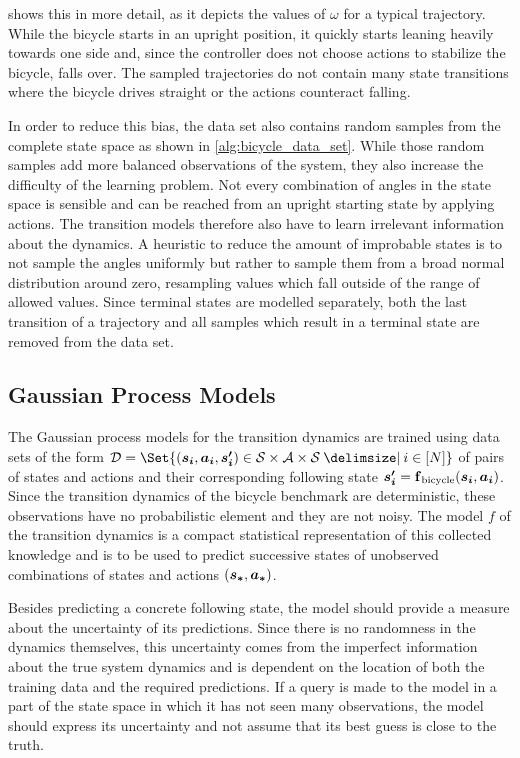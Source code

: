  shows this in more detail, as it depicts the values of $\omega$ for a typical trajectory.
While the bicycle starts in an upright position, it quickly starts leaning heavily towards one side and, since the controller does not choose actions to stabilize the bicycle, falls over.
The sampled trajectories do not contain many state transitions where the bicycle drives straight or the actions counteract falling.

In order to reduce this bias, the data set also contains random samples from the complete state space as shown in \cref{alg:bicycle_data_set}.
While those random samples add more balanced observations of the system, they also increase the difficulty of the learning problem.
Not every combination of angles in the state space is sensible and can be reached from an upright starting state by applying actions.
The transition models therefore also have to learn irrelevant information about the dynamics.
A heuristic to reduce the amount of improbable states is to not sample the angles uniformly but rather to sample them from a broad normal distribution around zero, resampling values which fall outside of the range of allowed values.
Since terminal states are modelled separately, both the last transition of a trajectory and all samples which result in a terminal state are removed from the data set.

\subsection{Gaussian Process Models}
\label{sub:gp_models}
The Gaussian process models for the transition dynamics are trained using data sets of the form $\D = \Set{(\mat{s_i}, \mat{a_i}, \mat{s_i^\prime}) \in \Es \times \Ah \times \Es \with i \in [N]}$ of pairs of states and actions and their corresponding following state $\bm{s_i^\prime} = \operatorname{\operatorname{\mathbf{f}}_{\text{bicycle}}}(\bm{s_i}, \bm{a_i})$.
Since the transition dynamics of the bicycle benchmark are deterministic, these observations have no probabilistic element and they are not noisy.
The model $f$ of the transition dynamics is a compact statistical representation of this collected knowledge and is to be used to predict successive states of unobserved combinations of states and actions $(\bm{s_\ast}, \bm{a_\ast})$.

Besides predicting a concrete following state, the model should provide a measure about the uncertainty of its predictions.
Since there is no randomness in the dynamics themselves, this uncertainty comes from the imperfect information about the true system dynamics and is dependent on the location of both the training data and the required predictions.
If a query is made to the model in a part of the state space in which it has not seen many observations, the model should express its uncertainty and not assume that its best guess is close to the truth.

